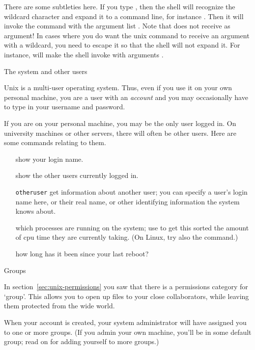 There are some subtleties here. If you type , then the shell
will recognize the wildcard character and expand it to a command line,
for instance . Then it will invoke the 
command with the argument list . Note that  does
not receive  as argument! In cases where you do want the unix
command to receive an argument with a wildcard, you need to escape it
so that the shell will not expand it. For instance,  will make the shell invoke  with arguments .

 {The system and other users}
\label{sec:users}

Unix is a multi-user operating system. Thus, even if you use it
on your own personal machine, you are a user with an \emph{account}
and you may occasionally
have to type in your username and password.

If you are on your personal machine, you may be the only user logged
in. On university machines or other servers, there will often be other
users. Here are some commands relating to them.

\begin{itemize}
\item [\indexunix{whoami}] show your login name.
\item [\indexunix{who}] show the other users currently logged in.
\item [\indexunix{finger} {\tt otheruser}] get information about another user;
  you can specify a user's login name here, or their real name,
  or other identifying information the system knows about.
\item [\indexunix{top}] which processes are running on the system; use
   to get this sorted the amount of cpu time they are
  currently taking. (On Linux, try also the  command.)
\item [\indexunix{uptime}] how long has it been since your last reboot?
\end{itemize}

 {Groups}

In section~\ref{sec:unix-permissions} you saw that there is a
permissions category for `group'. This allows you to open up files to
your close collaborators, while leaving them protected from the wide
world.

When your account is created, your system administrator will have
assigned you to one or more groups. (If you admin your own machine,
you'll be in some default group; read on for adding yourself to more groups.)

